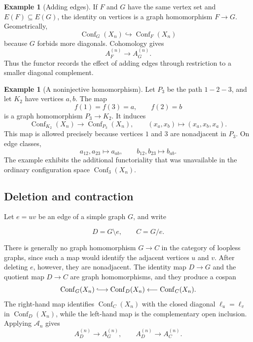 \documentclass[11pt]{amsart}
\theoremstyle{plain}
\theoremstyle{definition}
\newtheorem{example}[theorem]{Example}
\theoremstyle{remark}
\newcommand{\Conf}{\operatorname{Conf}}
\begin{document}
\begin{example}[Adding edges]
If $F$ and $G$ have the same vertex set and $E(F)\subseteq E(G)$, the identity
on vertices is a graph homomorphism $F\to G$.  Geometrically,
\[
  \Conf_G(X_n)\hookrightarrow\Conf_F(X_n)
\]
because $G$ forbids more diagonals.  Cohomology gives
\[
  A_F^{(n)}\longrightarrow A_G^{(n)}.
\]
Thus the functor records the effect of adding edges through restriction to a
smaller diagonal complement.
\end{example}

\begin{example}[A noninjective homomorphism]
Let $P_3$ be the path $1-2-3$, and let $K_2$ have vertices $a,b$.  The map
\[
  f(1)=f(3)=a,\qquad f(2)=b
\]
is a graph homomorphism $P_3\to K_2$.  It induces
\[
  \Conf_{K_2}(X_n)\longrightarrow\Conf_{P_3}(X_n),
  \qquad
  (x_a,x_b)\longmapsto(x_a,x_b,x_a).
\]
This map is allowed precisely because vertices $1$ and $3$ are nonadjacent in
$P_3$.  On edge classes,
\[
  a_{12},a_{23}\longmapsto a_{ab},
  \qquad
  b_{12},b_{23}\longmapsto b_{ab}.
\]
The example exhibits the additional functoriality that was unavailable in the
ordinary configuration space $\Conf_3(X_n)$.
\end{example}

\subsection{Deletion and contraction}\label{subsec:deletion-contraction}

Let $e=uv$ be an edge of a simple graph $G$, and write

\[
  D=G\setminus e,
  \qquad
  C=G/e.
\]

There is generally no graph homomorphism $G\to C$ in the category of
loopless graphs, since such a map would identify the adjacent vertices $u$
and $v$.  After deleting $e$, however, they are nonadjacent.  The identity
map $D\to G$ and the quotient map $D\to C$ are graph homomorphisms, and they
produce a cospan
\[
  \Conf_G(X_n)\lhook\joinrel\longrightarrow \Conf_D(X_n)
  \longleftarrow \Conf_C(X_n).
\]
The right-hand map identifies $\Conf_C(X_n)$ with the closed diagonal
$\ell_u=\ell_v$ in $\Conf_D(X_n)$, while the left-hand map is the
complementary open inclusion.  Applying $\mathcal A_n$ gives
\[
  A_D^{(n)}\longrightarrow A_G^{(n)},
  \qquad
  A_D^{(n)}\longrightarrow A_C^{(n)}.
\]
\end{document}

